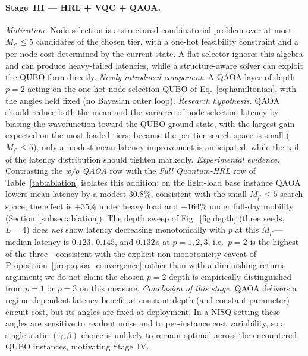 \documentclass[11pt,a4paper]{article}
\theoremstyle{definition}
\begin{document}
\paragraph{Stage~III --- HRL + VQC + QAOA.}
\emph{Motivation.} Node selection is a structured combinatorial problem over at most $M_{l^*}\!\leq\!5$ candidates of the chosen tier, with a one-hot feasibility constraint and a per-node cost determined by the current state. A flat selector ignores this algebra and can produce heavy-tailed latencies, while a structure-aware solver can exploit the QUBO form directly.
\emph{Newly introduced component.} A QAOA layer of depth $p\!=\!2$ acting on the one-hot node-selection QUBO of Eq.~\eqref{eq:hamiltonian}, with the angles held fixed (no Bayesian outer loop).
\emph{Research hypothesis.} QAOA should reduce both the mean and the variance of node-selection latency by biasing the wavefunction toward the QUBO ground state, with the largest gain expected on the most loaded tiers; because the per-tier search space is small ($M_{l^*}\!\leq\!5$), only a modest mean-latency improvement is anticipated, while the tail of the latency distribution should tighten markedly.
\emph{Experimental evidence.} Contrasting the \emph{w/o QAOA} row with the \emph{Full Quantum-HRL} row of Table~\ref{tab:ablation} isolates this addition: on the light-load base instance QAOA lowers mean latency by a modest $30.8\%$, consistent with the small $M_{l^*}\!\leq\!5$ search space; the effect is $+35\%$ under heavy load and $+164\%$ under full-day mobility (Section~\ref{subsec:ablation}). The depth sweep of Fig.~\ref{fig:depth} (three seeds, $L{=}4$) does \emph{not} show latency decreasing monotonically with $p$ at this $M_{l^*}$---median latency is $0.123$, $0.145$, and $0.132$\,s at $p=1,2,3$, i.e.\ $p{=}2$ is the highest of the three---consistent with the explicit non-monotonicity caveat of Proposition~\ref{prop:qaoa_convergence} rather than with a diminishing-returns argument; we do not claim the chosen $p{=}2$ depth is empirically distinguished from $p{=}1$ or $p{=}3$ on this measure.
\emph{Conclusion of this stage.} QAOA delivers a regime-dependent latency benefit at constant-depth (and constant-parameter) circuit cost, but its angles are fixed at deployment. In a NISQ setting these angles are sensitive to readout noise and to per-instance cost variability, so a single static $(\gamma,\beta)$ choice is unlikely to remain optimal across the encountered QUBO instances, motivating Stage~IV.
\end{document}
